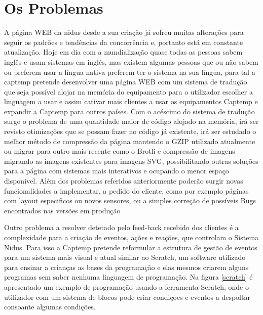 \section{Os Problemas}
A página WEB da nidus desde a sua criação já sofreu muitas alterações para seguir os padrões e tendências da concorrência e, portanto está em constante atualização. Hoje em dia com a mundialização quase todas as pessoas sabem inglês e usam sistemas em inglês, mas existem algumas pessoas que ou não sabem ou preferem usar a língua nativa preferem ter o sistema na sua língua, para tal a captemp pretende desenvolver uma página WEB com um sistema de tradução que seja possível alojar na memória do equipamento para o utilizador escolher a linguagem a usar e assim cativar mais clientes a usar os equipamentos Captemp e expandir a Captemp para outros países. Com o acéscimo do sistema de tradução surge o problema de uma quantidade maior de código alojado na memória, irá ser revisto otimizações que se possam fazer no código já existente, irá ser estudado o melhor método de compressão da página mantendo o GZIP utilizado atualmente ou migrar para outro mais recente como o Brotli e compressão de imagens migrando as imagens existentes para imagens SVG, possibilitando outras soluções para a página com sistemas mais interativos e ocupando o menor espaço disponivel. Além dos problemas referidos anteriormente poderão surgir novas funcionalidades a implementar, a pedido do cliente, como por exemplo páginas com layout especificos ou novos sensores, ou a simples correção de possíveis Bugs encontrados nas versões em produção
\par
Outro problema a resolver detetado pelo feed-back recebido dos clientes é a complexidade para a criação de eventos, ações e reações, que controlam o Sistema Nidus. Para isso a Captemp pretende reformular a estrutura de gestão de eventos para um sistema mais visual  e atual similar ao Scratch, um software utilizado para ensinar a crianças as bases da programação e elas mesmos criarem alguns programas sem saber nenhuma linguagem de programação. Na figura \ref{scratch} é apresentado um exemplo de programação usando a ferramenta Scratch, onde o utilizador com um sistema de blocos pode criar condiçoes e eventos a despoltar consoante algumas condições.

